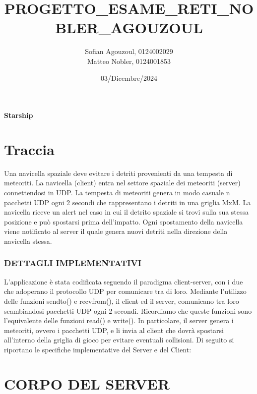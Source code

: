 \documentclass{article}
\title{PROGETTO\_ESAME\_RETI\_NOBLER\_AGOUZOUL}
\author{Sofian Agouzoul, 0124002029\\Matteo Nobler, 0124001853}
\date{03/Dicembre/2024}
\begin{document}
\raggedright\par
\maketitle\textbf{Starship}

\part{Traccia}
Una navicella spaziale deve evitare i detriti provenienti da una tempesta di meteoriti.
La navicella (client) entra nel settore spaziale dei meteoriti (server) connettendosi in UDP.
La tempesta di meteoriti genera in modo casuale n pacchetti UDP ogni 2 secondi che rappresentano i detriti in una griglia MxM. 
La navicella riceve un alert nel caso in cui il detrito spaziale si trovi sulla sua stessa posizione e può spostarsi prima dell'impatto.
Ogni spostamento della navicella viene notificato al server il quale genera nuovi detriti nella direzione della navicella stessa.

\section{DETTAGLI IMPLEMENTATIVI}
L'applicazione è stata codificata seguendo il paradigma client-server, con i due che adoperano il protocollo UDP per comunicare tra di loro. \newline
Mediante l'utilizzo delle funzioni sendto() e recvfrom(), il client ed il server, comunicano tra loro scambiandosi pacchetti UDP ogni 2 secondi. Ricordiamo che queste funzioni sono l'equivalente delle funzioni read() e write().
\newline
In particolare, il server genera i meteoriti, ovvero i pacchetti UDP, e li invia al client che dovrà spostarsi all'interno della griglia di gioco per evitare eventuali collisioni.
Di seguito si riportano le specifiche implementative del Server e del Client:
\newpage

\part{CORPO DEL SERVER}
\end{document}
